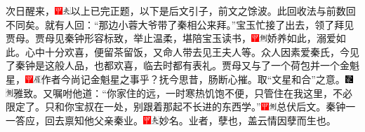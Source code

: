 次日醒来，{\includegraphics[width=3mm]{../Images/00002}\includegraphics[width=3mm]{../Images/00012}\footnotesize \kaishu 以上已完正题，以下是后文引子，前文之馀波。此回收法与前数回不同矣。}就有人回：“那边小蓉大爷带了秦相公来拜。”宝玉忙接了出去，领了拜见贾母。贾母见秦钟形容标致，举止温柔，堪陪宝玉读书，{\includegraphics[width=3mm]{../Images/00002}\includegraphics[width=3mm]{../Images/00011}\footnotesize \kaishu 娇养如此，溺爱如此。}心中十分欢喜，便留茶留饭，又命人带去见王夫人等。众人因素爱秦氏，今见了秦钟是这般人品，也都欢喜，临去时都有表礼。贾母又与了一个荷包并一个金魁星，{\includegraphics[width=3mm]{../Images/00002}\includegraphics[width=3mm]{../Images/00010}\footnotesize \kaishu 作者今尚记金魁星之事乎？抚今思昔，肠断心摧。}取“文星和合”之意。{\includegraphics[width=3mm]{../Images/00006}\includegraphics[width=3mm]{../Images/00011}\footnotesize \kaishu 雅致。}又嘱咐他道：“你家住的远，一时寒热饥饱不便，只管住在我这里，不必限定了。只和你宝叔在一处，别跟着那起不长进的东西学。”{\includegraphics[width=3mm]{../Images/00002}\includegraphics[width=3mm]{../Images/00011}\footnotesize \kaishu 总伏后文。}秦钟一一答应，回去禀知他父亲秦业。{\includegraphics[width=3mm]{../Images/00002}\includegraphics[width=3mm]{../Images/00012}\footnotesize \kaishu 妙名。业者，孽也，盖云情因孽而生也。}

